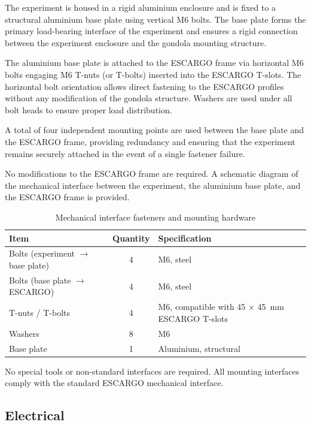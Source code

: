 \documentclass[12pt,a4paper]{report}
\begin{document}
The experiment is housed in a rigid aluminium enclosure and is fixed to a structural aluminium base plate using vertical M6 bolts. The base plate forms the primary load-bearing interface of the experiment and ensures a rigid connection between the experiment enclosure and the gondola mounting structure.

The aluminium base plate is attached to the ESCARGO frame via horizontal M6 bolts engaging M6 T-nuts (or T-bolts) inserted into the ESCARGO T-slots. The horizontal bolt orientation allows direct fastening to the ESCARGO profiles without any modification of the gondola structure. Washers are used under all bolt heads to ensure proper load distribution.

A total of four independent mounting points are used between the base plate and the ESCARGO frame, providing redundancy and ensuring that the experiment remains securely attached in the event of a single fastener failure.

No modifications to the ESCARGO frame are required. A schematic diagram of the mechanical interface between the experiment, the aluminium base plate, and the ESCARGO frame is provided.

\begin{table}[h]
\centering
\caption{Mechanical interface fasteners and mounting hardware}
\begin{tabular}{|l|c|l|}
\hline
\textbf{Item} & \textbf{Quantity} & \textbf{Specification} \\
\hline
Bolts (experiment $\rightarrow$ base plate) & 4 & M6, steel \\
Bolts (base plate $\rightarrow$ ESCARGO) & 4 & M6, steel \\
T-nuts / T-bolts & 4 & \makecell[l]{M6, compatible with 45 $\times$ 45~mm \\ ESCARGO T-slots} \\
Washers & 8 & M6 \\
Base plate & 1 & Aluminium, structural \\
\hline
\end{tabular}
\end{table}

No special tools or non-standard interfaces are required. All mounting interfaces comply with the standard ESCARGO mechanical interface.


\subsection{Electrical}
\end{document}
